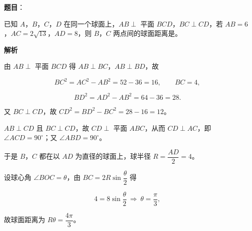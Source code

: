 \begin{answer}

\textbf{题目}：

已知 $A$，$B$，$C$，$D$ 在同一个球面上，$AB\perp$ 平面 $BCD$，$BC\perp CD$，若 $AB=6$，$AC=2\sqrt{13}$，$AD=8$，则 $B$，$C$ 两点间的球面距离是\gkblank{}。

\textbf{解析}

由 $AB\perp$ 平面 $BCD$ 得 $AB\perp BC$，$AB\perp BD$，故

\nopagebreak[4]
\[BC^2=AC^2-AB^2=52-36=16,\qquad BC=4,\]

\nopagebreak[4]
\[BD^2=AD^2-AB^2=64-36=28.\]

又 $BC\perp CD$，故 $CD^2=BD^2-BC^2=28-16=12$。

$AB\perp CD$ 且 $BC\perp CD$，故 $CD\perp$ 平面 $ABC$，从而 $CD\perp AC$，即 $\angle ACD=90^\circ$；又 $\angle ABD=90^\circ$。

于是 $B$，$C$ 都在以 $AD$ 为直径的球面上，球半径 $R=\dfrac{AD}2=4$。

设球心角 $\angle BOC=\theta$，由 $BC=2R\sin\dfrac\theta2$ 得

\nopagebreak[4]
\[4=8\sin\frac\theta2\ \Longrightarrow\ \theta=\frac{\pi}3,\]

故球面距离为 $R\theta=\dfrac{4\pi}3$。


\end{answer}
